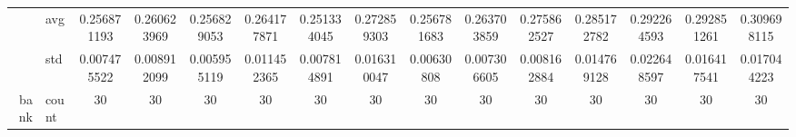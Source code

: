 \begin{table}[H]
{\begin{tabular}{rlccc|c|c|c|c|c|ccccc}
			                                                                               & avg                & \cellcolor[rgb]{ .651,  .82,  .494}0.256871193                                 & \cellcolor[rgb]{ .827,  .871,  .506}0.260623969                                & \cellcolor[rgb]{ .647,  .82,  .494}0.256829053                                 & \cellcolor[rgb]{ 1,  .922,  .518}0.264177871    & \cellcolor[rgb]{ .388,  .745,  .482}\textcolor[rgb]{ 0,  .38,  0}{0.251334045} & \cellcolor[rgb]{ .996,  .827,  .502}0.272859303 & \cellcolor[rgb]{ .647,  .82,  .494}0.256781683                                 & \cellcolor[rgb]{ .976,  .914,  .514}0.263703859 & \cellcolor[rgb]{ .996,  .792,  .494}0.275862527 & \cellcolor[rgb]{ .988,  .69,  .475}0.285172782  & \cellcolor[rgb]{ .984,  .608,  .459}0.292264593 & \cellcolor[rgb]{ .984,  .604,  .459}0.292851261 & \cellcolor[rgb]{ .973,  .412,  .42}0.309698115  \\
			                                                                               & std                & 0.007475522                                                                    & 0.008912099                                                                    & 0.005955119                                                                    & 0.011452365                                     & 0.007814891                                                                    & 0.016310047                                     & 0.00630808                                                                     & 0.007306605                                     & 0.008162884                                     & 0.014769128                                     & 0.022648597                                     & 0.016417541                                     & 0.017044223                                     \\
			bank                                                                           & count              & 30                                                                             & 30                                                                             & 30                                                                             & 30                                              & 30                                                                             & 30                                              & 30                                                                             & 30                                              & 30                                              & 30                                              & 30                                              & 30                                              & 30                                              \\

\end{tabular}}
\end{table}
